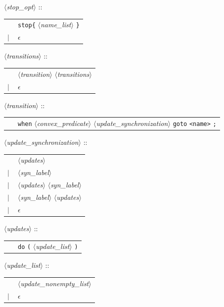 \documentclass[a4paper,11pt]{report}
\newcommand{\emptystring}{$\epsilon$}
\newcommand{\nt}[1]{$\langle$\emph{#1}$\rangle$}
\newcommand{\regleGrammaire}[1]{\bigskip \noindent \nt{#1} :: \\}
\newcommand{\styleIMI}[1]{\textcolor{imicolor}{\texttt{#1}}}
\begin{document}
\regleGrammaire{stop\_opt}
\begin{tabular}{l l}
	\ & \styleIMI{stop\{} \nt{name\_list} \styleIMI{\}} \\
	$|$ & \emptystring \\
\end{tabular}

	
\regleGrammaire{transitions}
\begin{tabular}{l l}
	\  & \nt{transition} \nt{transitions} \\
	$|$ & \emptystring \\
\end{tabular}

\regleGrammaire{transition}
\begin{tabular}{l l}
	\  & \styleIMI{when} \nt{convex\_predicate} \nt{update\_synchronization} \styleIMI{goto} \styleIMI{<name>} \styleIMI{;} \\
\end{tabular}

\regleGrammaire{update\_synchronization}
\begin{tabular}{l l}
	\  & \nt{updates} \\
	$|$ & \nt{syn\_label} \\
	$|$ & \nt{updates} \nt{syn\_label} \\
	$|$ & \nt{syn\_label} \nt{updates} \\
	$|$ & \emptystring \\
\end{tabular}

\regleGrammaire{updates}
\begin{tabular}{l l}
	\  & \styleIMI{do} \styleIMI{(} \nt{update\_list} \styleIMI{)} \\
\end{tabular}

\regleGrammaire{update\_list}
\begin{tabular}{l l}
	\  & \nt{update\_nonempty\_list} \\
	$|$ & \emptystring \\
\end{tabular}
\end{document}
